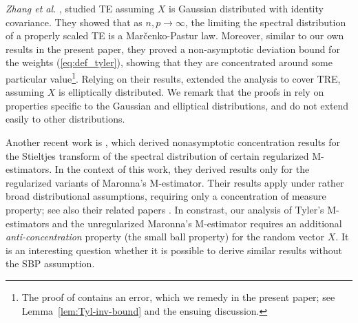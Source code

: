 \documentclass[times,sort&compress,3p]{elsarticle}
\newcommand{\Revision}[1]{{#1}}
\begin{document}
{\it Zhang et al.}
 \cite{zhang2016marvcenko}, 
 studied TE assuming $X$ is Gaussian distributed with identity covariance. 
 They
 showed
 that as $n,p\to\infty$, 
 the limiting
 the spectral distribution 
 of a properly scaled TE 
 is
 a
 Mar\v{c}enko-Pastur 
 law.
 Moreover,
 similar to our own results in the present paper,
 they 
proved a non-asymptotic deviation bound for the weights (\ref{eq:def_tyler}), showing that they are concentrated around some particular value\footnote{
 The proof of \cite[Lemma 3.3]{zhang2016marvcenko}  contains an error,
 which we remedy in the present paper; see Lemma~\ref{lem:Tyl-inv-bound} and the ensuing discussion.
 }.
Relying on their results, \cite{goes2017robust} extended 
the analysis
to cover TRE, assuming $X$ is elliptically distributed.
We remark that the proofs in 
\cite{zhang2016marvcenko,goes2017robust} rely on properties specific to the Gaussian and elliptical distributions, and do not extend easily to other distributions.

Another recent work is \cite{louart2020robust}, which derived nonasymptotic concentration results for the Stieltjes transform of the spectral distribution of certain \Revision{regularized} M-estimators.
\Revision{
In the context of this work, they derived results only for the regularized variants of Maronna's M-estimator.
}
Their results apply under rather broad distributional assumptions, requiring only a concentration of measure property; see also their related papers \cite{louart2018concentration,louart2020equations}. 
\Revision{In constrast, our analysis of Tyler's M-estimators and the unregularized Maronna's M-estimator requires an additional \emph{anti-concentration} property (the small ball property) for the random vector $X$. It is an interesting question whether it is possible to derive similar results without the SBP assumption.
}
\end{document}
